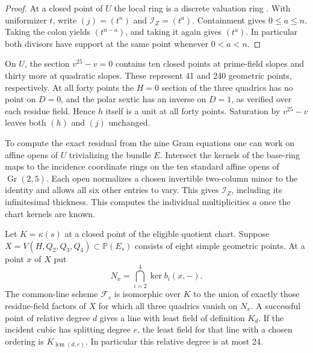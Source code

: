 \begin{proof}
At a closed point of \(U\) the local ring is a discrete valuation ring
\cite{stacksSmoothCurveDivisors}. With uniformizer \(t\), write
\((j)=(t^n)\) and \(\mathcal I_Z=(t^a)\). Containment gives
\(0\le a\le n\). Taking the colon yields \((t^{n-a})\), and taking it
again gives \((t^a)\). In particular both divisors have support at the
same point whenever \(0<a<n\).
\end{proof}

On \(U\), the section \(v^{25}-v=0\) contains ten closed points at
prime-field slopes and thirty more at quadratic slopes. These represent
41 and 240 geometric points, respectively. At all forty points the
\(H=0\) section of the three quadrics has no point on \(D=0\), and
the polar sextic has an inverse on \(D=1\), as verified over each
residue field. Hence \(h\) itself is a unit at all forty points.
Saturation by \(v^{25}-v\) leaves both \((h)\) and \((j)\) unchanged.

To compute the exact residual from the nine Gram equations one can work
on affine opens of \(U\) trivializing the bundle \(E\). Intersect the
kernels of the base-ring maps to the incidence coordinate rings on the
ten standard affine opens of \(\operatorname{Gr}(2,5)\). Each open
normalizes a chosen invertible two-column minor to the identity and
allows all six other entries to vary. This gives \(\mathcal I_Z\),
including its infinitesimal thickness. This computes the individual
multiplicities \(a\) once the chart kernels are known.

\begin{proposition}
\label{prop:common-line-extension}
Let \(K=\kappa(s)\) at a closed point of the eligible quotient chart.
Suppose \(X=V(H,Q_2,Q_3,Q_4)\subset\mathbb P(E_s)\) consists of
eight simple geometric points. At a point \(x\) of \(X\) put
\[
       N_x=\bigcap_{i=2}^4\ker b_i(x,-).
\]
The common-line scheme \(\mathcal F_s\) is isomorphic over \(K\) to
the union of exactly those residue-field factors of \(X\) for which
all three quadrics vanish on \(N_x\). A successful point of relative
degree \(d\) gives a line with least field of definition \(K_d\).
If the incident cubic has splitting degree \(e\), the least field for
that line with a chosen ordering is \(K_{\operatorname{lcm}(d,e)}\).
In particular this relative degree is at most 24.
\end{proposition}

